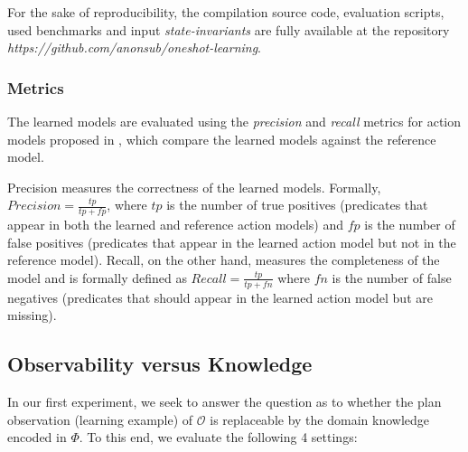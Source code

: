 \documentclass{article}
\begin{document}
For the sake of reproducibility, the compilation source code, evaluation scripts, used benchmarks and input {\em state-invariants} are fully available at the repository {\em https://github.com/anonsub/oneshot-learning}.

\subsubsection{Metrics}
The learned models are evaluated using the {\em precision} and {\em recall} metrics for action models proposed in \cite{aineto2018learning}, which compare the learned models against the reference model.

Precision measures the correctness of the learned models. Formally, $Precision=\frac{tp}{tp+fp}$, where $tp$ is the number of true positives (predicates that appear in both the learned and reference action models) and $fp$ is the number of false positives (predicates that appear in the learned action model but not in the reference model). Recall, on the other hand, measures the completeness of the model and is formally defined as $Recall=\frac{tp}{tp+fn}$ where $fn$ is the number of false negatives (predicates that should appear in the learned action model but are missing).



\subsection{Observability versus Knowledge}
In our first experiment, we seek to answer the question as to whether the plan observation (learning example) of $\mathcal{O}$ is replaceable by the domain knowledge encoded in $\Phi$. To this end, we evaluate the following 4 settings:
\end{document}
